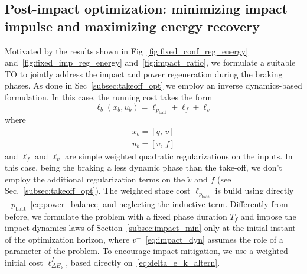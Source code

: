 \subsection{Post-impact optimization: minimizing impact impulse and maximizing energy recovery}\label{subsec:energy_rec_opt}
Motivated by the results shown in Fig~\ref{fig:fixed_conf_reg_energy} and~\ref{fig:fixed_imp_reg_energy} and~\ref{fig:impact_ratio}, we formulate a suitable TO to jointly address the impact and power regeneration during the braking phases. As done in Sec~\ref{subsec:takeoff_opt} we employ an inverse dynamics-based formulation. In this case, the running cost takes the form
\begin{dmath}\label{eq:takeoff_running_cost_braking}
    \ell_{b}(x_b, u_b) = \ell_{p_{\mathrm{batt}}} + \ell_f + \ell_{\dot{v}}
\end{dmath}
where\vspace{-0.5cm}
\begin{eqnarray}
    x_b = \left[q,\,v\right]\\
    u_b = \left[\dot{v},\,f\right]
\end{eqnarray}
and $\ell_f$ and $\ell_{\dot{v}}$ are simple weighted quadratic regularizations on the inputs. In this case, being the braking a less dynamic phase than the take-off, we don't employ the additional regularization terms on the $\ddot{v}$ and $\dot{f}$ (see Sec.~\ref{subsec:takeoff_opt}). The weighted stage cost $\ell_{p_{\mathrm{batt}}}$ is build using directly $- p_{\mathrm{batt}}$~\eqref{eq:power_balance} and neglecting the inductive term. 
Differently from before, we formulate the problem with a fixed phase duration $T_f$ and impose the impact dynamics laws of Section~\ref{subsec:impact_min} only at the initial instant of the optimization horizon, where $v^{-}$~\eqref{eq:impact_dyn} assumes the role of a parameter of the problem. To encourage impact mitigation, we use a weighted initial cost $\ell_{\Delta E_k}^{I}$, based directly on~\eqref{eq:delta_e_k_altern}. 
